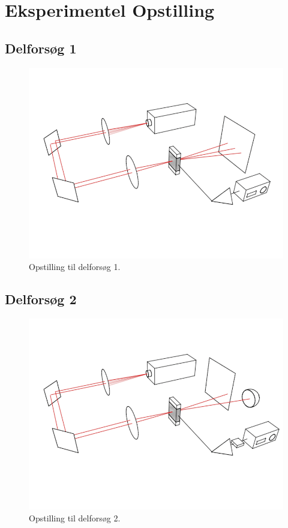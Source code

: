 \documentclass[main]{subfiles}
\begin{document}
\section{Eksperimentel Opstilling}
\subsection{Delforsøg 1}
\begin{figure}[H]
    \includegraphics[width=\linewidth]{tegninger/tegning1.png}
    \caption{Opstilling til delforsøg 1.}
    \label{fig:opstilling1}
\end{figure}
\subsection{Delforsøg 2}
\begin{figure}[H]
    \includegraphics[width=\linewidth]{tegninger/tegning2.png}
    \caption{Opstilling til delforsøg 2.}
    \label{fig:opstilling2}
\end{figure}
\end{document}
